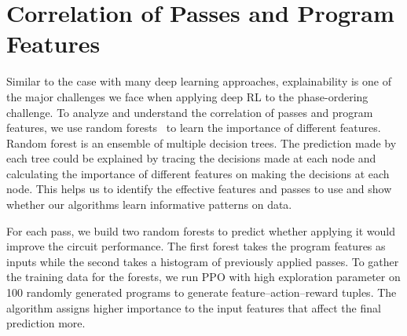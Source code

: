 
\section{Correlation of Passes and Program Features} 

\label{sec:features}
Similar to the case with many deep learning approaches, explainability is one of the major challenges we face when applying deep RL to the phase-ordering challenge. To analyze and understand the correlation of passes and program features, we use random forests~\cite{breiman2001random} to learn the importance of different features. Random forest is an ensemble of multiple decision trees. 
The prediction made by each tree could be explained by tracing the decisions made at each node and calculating the importance of different features on making the decisions at each node. 
This helps us to identify the effective features and passes to use and show whether our algorithms learn informative patterns on data.

For each pass, we build two random forests to predict whether applying it would improve the circuit performance. The first forest takes the program features as inputs while the second takes a histogram of previously applied passes. To gather the training data for the forests, we run PPO with high exploration parameter on 100 randomly generated programs to generate feature--action--reward tuples. The algorithm assigns higher importance to the input features that affect the final prediction more. 

